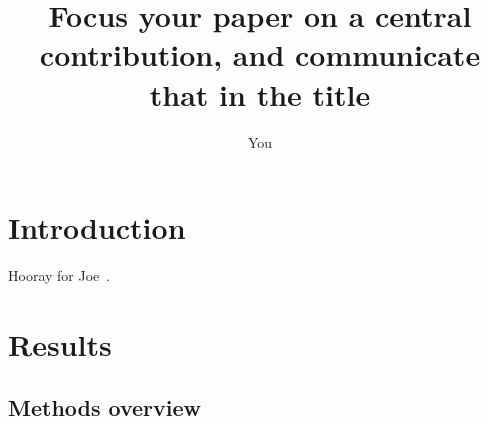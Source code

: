 \documentclass{article}
\title{Focus your paper on a central contribution, and communicate that in the title}
\author{You}
\begin{document}
\maketitle

\begin{abstract}
\end{abstract}


\section*{Introduction}







Hooray for Joe~\cite{Felsenstein1981-zs}.

\section*{Results}

\subsection*{Methods overview}



\end{document}

